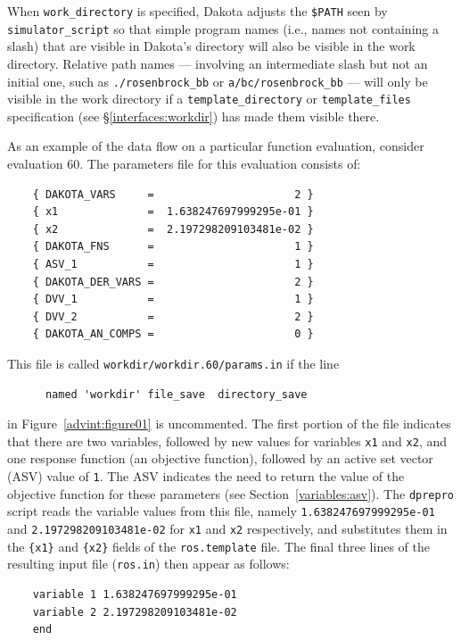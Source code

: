 When \texttt{work\_directory} is specified, Dakota adjusts the \texttt{\$PATH} seen
by \texttt{simulator\_script} so that simple program names
(i.e., names not containing a slash) that
are visible in Dakota's directory will also be visible in the work directory.
Relative path names ---
involving an intermediate slash but not an initial one,
such as \texttt{./rosenbrock\_bb} or \texttt{a/bc/rosenbrock\_bb} ---
will only be visible in the work directory if a \texttt{template\_directory}
or \texttt{template\_files} specification (see \S\ref{interfaces:workdir})
has made them visible there.

As an example of the data flow on a particular function evaluation,
consider evaluation 60. The parameters file for this evaluation consists of:
\begin{small}
\begin{verbatim}
    { DAKOTA_VARS     =                      2 }
    { x1              =  1.638247697999295e-01 }
    { x2              =  2.197298209103481e-02 }
    { DAKOTA_FNS      =                      1 }
    { ASV_1           =                      1 }
    { DAKOTA_DER_VARS =                      2 }
    { DVV_1           =                      1 }
    { DVV_2           =                      2 }
    { DAKOTA_AN_COMPS =                      0 }
\end{verbatim}
\end{small}

This file is called \texttt{workdir/workdir.60/params.in} if the line
\begin{small}
\begin{verbatim}
 	  named 'workdir' file_save  directory_save
\end{verbatim}
\end{small}
in Figure~\ref{advint:figure01} is uncommented.
The first portion of the file indicates that there are two variables,
followed by new values for variables \texttt{x1} and \texttt{x2}, and
one response function (an objective function), followed by an active
set vector (ASV) value of \texttt{1}. The ASV indicates the need to
return the value of the objective function for these parameters (see
Section~\ref{variables:asv}). The \texttt{dprepro} script reads the
variable values from this file, namely \texttt{1.638247697999295e-01}
and \texttt{2.197298209103481e-02} for \texttt{x1} and \texttt{x2}
respectively, and substitutes them in the \texttt{\{x1\}} and
\texttt{\{x2\}} fields of the \texttt{ros.template} file. The final
three lines of the resulting input file (\texttt{ros.in}) then appear
as follows:
\begin{small}
\begin{verbatim}
    variable 1 1.638247697999295e-01
    variable 2 2.197298209103481e-02
    end
\end{verbatim}
\end{small}

